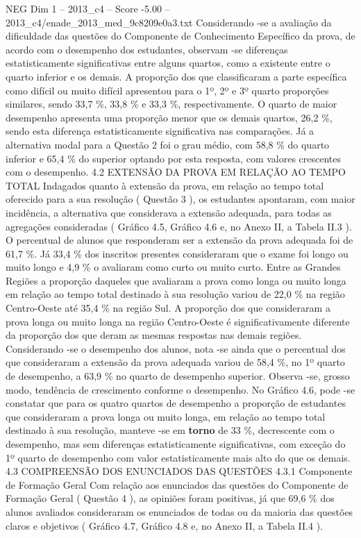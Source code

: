 \begin{textsample}{NEG Dim 1 – 2013\_c4 – Score -5.00 – 2013\_c4/enade\_2013\_med\_9c8209e0a3.txt}
Considerando -se a avaliação da dificuldade das questões do Componente de Conhecimento Específico da prova, de acordo com o desempenho dos estudantes, observam -se diferenças estatisticamente significativas entre alguns quartos, como a existente entre o quarto inferior e os demais.
A proporção dos que classificaram a parte específica como difícil ou muito difícil apresentou para o 1º, 2º e 3º quarto proporções similares, sendo 33,7 \%, 33,8 \% e 33,3 \%, respectivamente.
O quarto de maior desempenho apresenta uma proporção menor que os demais quartos, 26,2 \%, sendo esta diferença estatisticamente significativa nas comparações.
Já a alternativa modal para a Questão 2 foi o grau médio, com 58,8 \% do quarto inferior e 65,4 \% do superior optando por esta resposta, com valores crescentes com o desempenho. 4.2 EXTENSÃO DA PROVA EM RELAÇÃO AO TEMPO TOTAL Indagados quanto à extensão da prova, em relação ao tempo total oferecido para a sua resolução ( Questão 3 ), os estudantes apontaram, com maior incidência, a alternativa que considerava a extensão adequada, para todas as agregações consideradas ( Gráfico 4.5, Gráfico 4.6 e, no Anexo II, a Tabela II.3 ).
O percentual de alunos que responderam ser a extensão da prova adequada foi de 61,7 \%.
Já 33,4 \% dos inscritos presentes consideraram que o exame foi longo ou muito longo e 4,9 \% o avaliaram como curto ou muito curto.
Entre as Grandes Regiões a proporção daqueles que avaliaram a prova como longa ou muito longa em relação ao tempo total destinado à sua resolução variou de 22,0 \% na região Centro-Oeste até 35,4 \% na região Sul.
A proporção dos que consideraram a prova longa ou muito longa na região Centro-Oeste é significativamente diferente da proporção dos que deram as mesmas respostas nas demais regiões.
Considerando -se o desempenho dos alunos, nota -se ainda que o percentual dos que consideraram a extensão da prova adequada variou de 58,4 \%, no 1º quarto de desempenho, a 63,9 \% no quarto de desempenho superior.
Observa -se, grosso modo, tendência de crescimento conforme o desempenho.
No Gráfico 4.6, pode -se constatar que para os quatro quartos de desempenho a proporção de estudantes que consideraram a prova longa ou muito longa, em relação ao tempo total destinado à sua resolução, manteve -se em \textbf{torno} de 33 \%, decrescente com o desempenho, mas sem diferenças estatisticamente significativas, com exceção do 1º quarto de desempenho com valor estatisticamente mais alto do que os demais. 4.3 COMPREENSÃO DOS ENUNCIADOS DAS QUESTÕES 4.3.1 Componente de Formação Geral Com relação aos enunciados das questões do Componente de Formação Geral ( Questão 4 ), as opiniões foram positivas, já que 69,6 \% dos alunos avaliados consideraram os enunciados de todas ou da maioria das questões claros e objetivos ( Gráfico 4.7, Gráfico 4.8 e, no Anexo II, a Tabela II.4 ).

\end{textsample}
